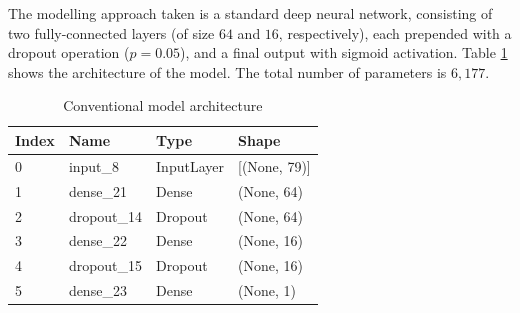 \documentclass[conference]{IEEEtran}
\begin{document}
The modelling approach taken is a standard deep neural network, consisting of two fully-connected layers (of size $64$ and $16$, respectively), each prepended with a dropout operation ($p=0.05$), and a final output with sigmoid activation. Table \ref{tab:conv_arch} shows the architecture of the model. The total number of parameters is $6,177$.

\begin{table}
    \caption{Conventional model architecture}
    \label{tab:conv_arch}
    \centering
    \begin{tabular}{llll}
        \toprule
        Index &        Name &        Type &         Shape \\
        \midrule
        0 &     input\_8 &  InputLayer &  [(None, 79)] \\
        1 &    dense\_21 &       Dense &    (None, 64) \\
        2 &  dropout\_14 &     Dropout &    (None, 64) \\
        3 &    dense\_22 &       Dense &    (None, 16) \\
        4 &  dropout\_15 &     Dropout &    (None, 16) \\
        5 &    dense\_23 &       Dense &     (None, 1) \\
        \bottomrule
    \end{tabular}
\end{table}


\end{document}
